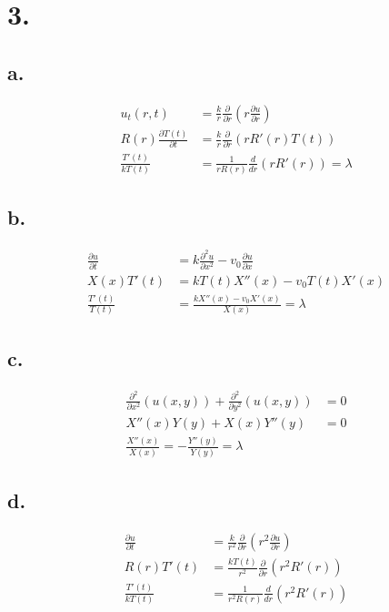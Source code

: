 \documentclass[11pt]{article}
\theoremstyle{mystyle}
\theoremstyle{definition}
\begin{document}
\section*{3.}
\subsection*{a.}
\begin{align*}
  u_t(r,t)  &= \displaystyle\frac{k}{r} \displaystyle\frac{\partial}{\partial r} \left( r \displaystyle\frac{\partial u}{\partial r}\right)\\
  R(r)\displaystyle\frac{\partial T(t)}{\partial t} &= \displaystyle\frac{k}{r} \displaystyle\frac{\partial }{\partial r} (r R'(r) T(t)) \\
  \displaystyle\frac{T'(t)}{kT(t)} &= \displaystyle\frac{1}{rR(r)} \displaystyle\frac{d}{dr}(rR'(r)) = \lambda
\end{align*}
\subsection*{b.}
\begin{align*}
  \displaystyle\frac{\partial u}{\partial t} &= k \displaystyle\frac{\partial^2 u}{\partial x^2} - v_0 \displaystyle\frac{\partial u}{\partial x} \\
  X(x) T'(t) &= k T(t) X''(x) - v_0 T(t) X'(x) \\
  \displaystyle\frac{T'(t)}{T(t)} &= \displaystyle\frac{k X''(x) - v_0X'(x)}{X(x)} = \lambda
\end{align*}
\subsection*{c.}
\begin{align*}
  \displaystyle\frac{\partial^2}{\partial x^2}(u(x,y)) + \displaystyle\frac{\partial^2}{\partial y^2}(u(x,y)) &= 0\\
  X''(x)Y(y) + X(x)Y''(y)&= 0 \\
  \displaystyle\frac{X''(x)}{X(x)} = - \displaystyle\frac{Y''(y)}{Y(y)} = \lambda
\end{align*}
\subsection*{d.}
\begin{align*}
  \displaystyle\frac{\partial u}{\partial t} &= \displaystyle\frac{k}{r^2} \displaystyle\frac{\partial }{\partial r} \left( r^2 \displaystyle\frac{\partial u}{\partial r}\right) \\
  R(r)T'(t) &= \displaystyle\frac{kT(t)}{r^2} \displaystyle\frac{\partial }{\partial r} \left(r^2 R'(r)\right) \\
  \displaystyle\frac{T'(t)}{kT(t)} &= \displaystyle\frac{1}{r^2R(r)} \displaystyle\frac{d}{dr}(r^2 R'(r))
\end{align*}
\end{document}
